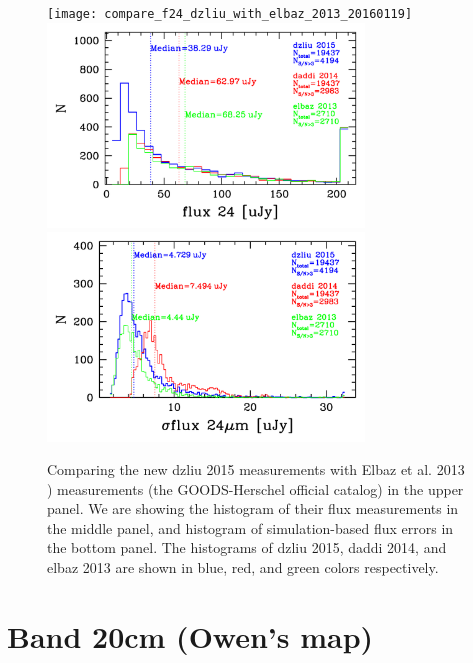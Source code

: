 \documentclass[11pt,a4paper]{article}
\begin{document}
\begin{figure}[H]
	\texttt{[image: compare\_f24\_dzliu\_with\_elbaz\_2013\_20160119]}
	\includegraphics[width=0.75\textwidth]{compare_f24_histogram_dzliu_daddi_elbaz_20160124}
	\includegraphics[width=0.75\textwidth]{compare_df24_histogram_dzliu_daddi_elbaz_20160124}
	\caption{\label{Fig_compare_df24_histogram}
		Comparing the new dzliu 2015 measurements with Elbaz et al. 2013 {)} measurements (the GOODS-Herschel official catalog) in the upper panel. We are showing the histogram of their flux measurements in the middle panel, and histogram of simulation-based flux errors in the bottom panel. The histograms of dzliu 2015, daddi 2014, and elbaz 2013 are shown in blue, red, and green colors respectively. }
\end{figure}





\clearpage

\section{Band 20cm (Owen's map)}
\end{document}

